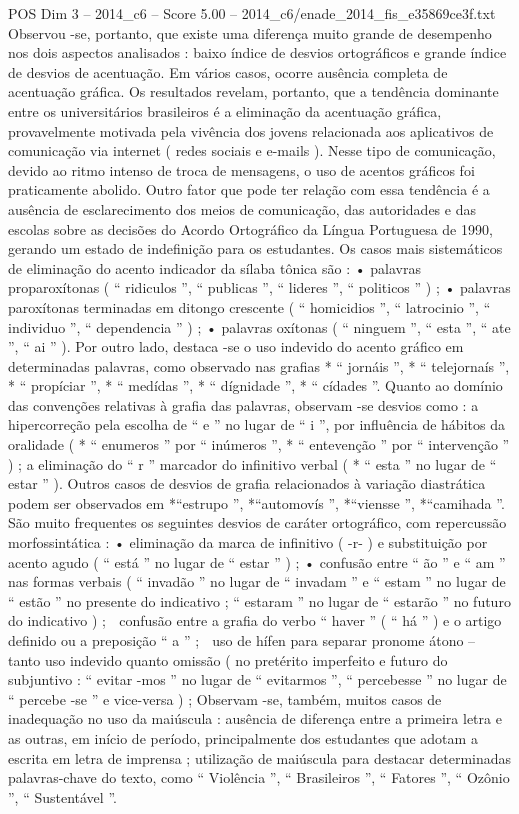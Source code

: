 \begin{textsample}{POS Dim 3 – 2014\_c6 – Score 5.00 – 2014\_c6/enade\_2014\_fis\_e35869ce3f.txt}
Observou -se, portanto, que existe uma diferença muito grande de desempenho nos dois aspectos analisados : baixo índice de desvios ortográficos e grande índice de desvios de acentuação.
Em vários casos, ocorre ausência completa de acentuação gráfica.
Os resultados revelam, portanto, que a tendência dominante entre os universitários brasileiros é a eliminação da acentuação gráfica, provavelmente motivada pela vivência dos jovens relacionada aos aplicativos de comunicação via internet ( redes sociais e e-mails ).
Nesse tipo de comunicação, devido ao ritmo intenso de troca de mensagens, o uso de acentos gráficos foi praticamente abolido.
Outro fator que pode ter relação com essa tendência é a ausência de esclarecimento dos meios de comunicação, das autoridades e das escolas sobre as decisões do Acordo Ortográfico da Língua Portuguesa de 1990, gerando um estado de indefinição para os estudantes.
Os casos mais sistemáticos de eliminação do acento indicador da sílaba tônica são : • palavras proparoxítonas ( “ ridiculos ”, “ publicas ”, “ lideres ”, “ politicos ” ) ; • palavras paroxítonas terminadas em ditongo crescente ( “ homicidios ”, “ latrocinio ”, “ individuo ”, “ dependencia ” ) ; • palavras oxítonas ( “ ninguem ”, “ esta ”, “ ate ”, “ ai ” ).
Por outro lado, destaca -se o uso indevido do acento gráfico em determinadas palavras, como observado nas grafias * “ jornáis ”, * “ telejornaís ”, * “ propíciar ”, * “ medídas ”, * “ dígnidade ”, * “ cídades ”.
Quanto ao domínio das convenções relativas à grafia das palavras, observam -se desvios como : a hipercorreção pela escolha de “ e ” no lugar de “ i ”, por influência de hábitos da oralidade ( * “ enumeros ” por “ inúmeros ”, * “ entevenção ” por “ intervenção ” ) ; a eliminação do “ r ” marcador do infinitivo verbal ( * “ esta ” no lugar de “ estar ” ).
Outros casos de desvios de grafia relacionados à variação diastrática podem ser observados em *“estrupo ”, *“automovís ”, *“viensse ”, *“camihada ”.
São muito frequentes os seguintes desvios de caráter ortográfico, com repercussão morfossintática : • eliminação da marca de infinitivo ( -r- ) e substituição por acento agudo ( “ está ” no lugar de “ estar ” ) ; • confusão entre “ ão ” e “ am ” nas formas verbais ( “ invadão ” no lugar de “ invadam ” e “ estam ” no lugar de “ estão ” no presente do indicativo ; “ estaram ” no lugar de “ estarão ” no futuro do indicativo ) ;  confusão entre a grafia do verbo “ haver ” ( “ há ” ) e o artigo definido ou a preposição “ a ” ;  uso de hífen para separar pronome átono – tanto uso indevido quanto omissão ( no pretérito imperfeito e futuro do subjuntivo : “ evitar -mos ” no lugar de “ evitarmos ”, “ percebesse ” no lugar de “ percebe -se ” e vice-versa ) ; Observam -se, também, muitos casos de inadequação no uso da maiúscula : ausência de diferença entre a primeira letra e as outras, em início de período, principalmente dos estudantes que adotam a escrita em letra de imprensa ; utilização de maiúscula para destacar determinadas palavras-chave do texto, como “ Violência ”, “ Brasileiros ”, “ Fatores ”, “ Ozônio ”, “ Sustentável ”.

\end{textsample}
